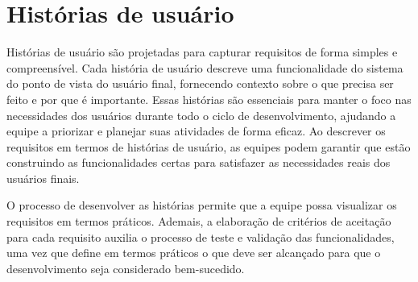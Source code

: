 \section{Histórias de usuário}

    Histórias de usuário são projetadas para capturar requisitos de forma simples e compreensível. Cada história de usuário descreve uma funcionalidade do sistema do ponto de vista do usuário final, fornecendo contexto sobre o que precisa ser feito e por que é importante. Essas histórias são essenciais para manter o foco nas necessidades dos usuários durante todo o ciclo de desenvolvimento, ajudando a equipe a priorizar e planejar suas atividades de forma eficaz. Ao descrever os requisitos em termos de histórias de usuário, as equipes podem garantir que estão construindo as funcionalidades certas para satisfazer as necessidades reais dos usuários finais.
    
    O processo de desenvolver as histórias permite que a equipe possa visualizar os requisitos em termos práticos. Ademais, a elaboração de critérios de aceitação para cada requisito auxilia o processo de teste e validação das funcionalidades, uma vez que define em termos práticos o que deve ser alcançado para que o desenvolvimento seja considerado bem-sucedido.

